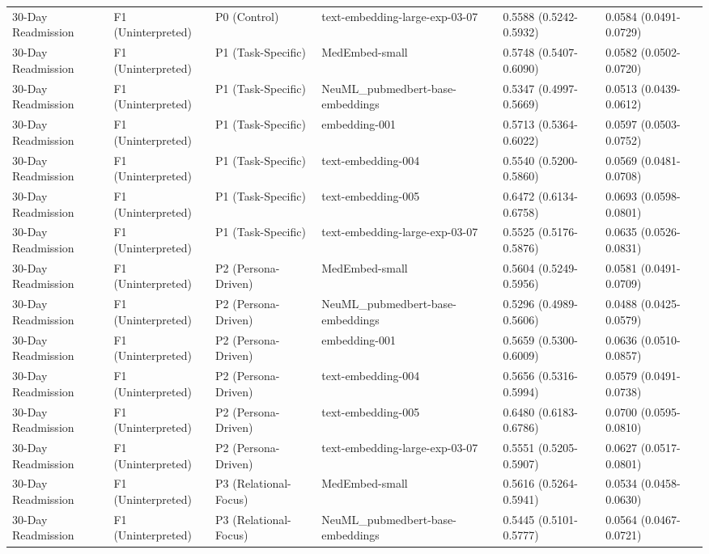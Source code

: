 \begin{tabular}{llllll}
30-Day Readmission & F1 (Uninterpreted) & P0 (Control) & text-embedding-large-exp-03-07 & 0.5588 (0.5242-0.5932) & 0.0584 (0.0491-0.0729) \\
30-Day Readmission & F1 (Uninterpreted) & P1 (Task-Specific) & MedEmbed-small & 0.5748 (0.5407-0.6090) & 0.0582 (0.0502-0.0720) \\
30-Day Readmission & F1 (Uninterpreted) & P1 (Task-Specific) & NeuML\_pubmedbert-base-embeddings & 0.5347 (0.4997-0.5669) & 0.0513 (0.0439-0.0612) \\
30-Day Readmission & F1 (Uninterpreted) & P1 (Task-Specific) & embedding-001 & 0.5713 (0.5364-0.6022) & 0.0597 (0.0503-0.0752) \\
30-Day Readmission & F1 (Uninterpreted) & P1 (Task-Specific) & text-embedding-004 & 0.5540 (0.5200-0.5860) & 0.0569 (0.0481-0.0708) \\
30-Day Readmission & F1 (Uninterpreted) & P1 (Task-Specific) & text-embedding-005 & 0.6472 (0.6134-0.6758) & 0.0693 (0.0598-0.0801) \\
30-Day Readmission & F1 (Uninterpreted) & P1 (Task-Specific) & text-embedding-large-exp-03-07 & 0.5525 (0.5176-0.5876) & 0.0635 (0.0526-0.0831) \\
30-Day Readmission & F1 (Uninterpreted) & P2 (Persona-Driven) & MedEmbed-small & 0.5604 (0.5249-0.5956) & 0.0581 (0.0491-0.0709) \\
30-Day Readmission & F1 (Uninterpreted) & P2 (Persona-Driven) & NeuML\_pubmedbert-base-embeddings & 0.5296 (0.4989-0.5606) & 0.0488 (0.0425-0.0579) \\
30-Day Readmission & F1 (Uninterpreted) & P2 (Persona-Driven) & embedding-001 & 0.5659 (0.5300-0.6009) & 0.0636 (0.0510-0.0857) \\
30-Day Readmission & F1 (Uninterpreted) & P2 (Persona-Driven) & text-embedding-004 & 0.5656 (0.5316-0.5994) & 0.0579 (0.0491-0.0738) \\
30-Day Readmission & F1 (Uninterpreted) & P2 (Persona-Driven) & text-embedding-005 & 0.6480 (0.6183-0.6786) & 0.0700 (0.0595-0.0810) \\
30-Day Readmission & F1 (Uninterpreted) & P2 (Persona-Driven) & text-embedding-large-exp-03-07 & 0.5551 (0.5205-0.5907) & 0.0627 (0.0517-0.0801) \\
30-Day Readmission & F1 (Uninterpreted) & P3 (Relational-Focus) & MedEmbed-small & 0.5616 (0.5264-0.5941) & 0.0534 (0.0458-0.0630) \\
30-Day Readmission & F1 (Uninterpreted) & P3 (Relational-Focus) & NeuML\_pubmedbert-base-embeddings & 0.5445 (0.5101-0.5777) & 0.0564 (0.0467-0.0721) \\

\end{tabular}

